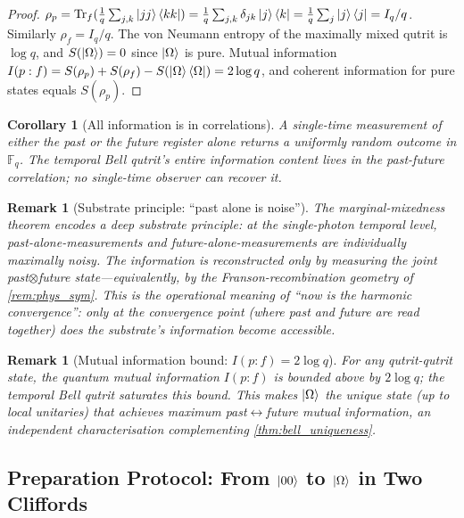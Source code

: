 ﻿\documentclass[12pt]{article}
\newtheorem{corollary}[theorem]{Corollary}
\newtheorem{remark}[theorem]{Remark}
\newcommand{\GF}[1]{\mathbb{F}_{#1}}
\begin{document}
\begin{proof}
$\rho_p = \mathrm{Tr}_f(\frac{1}{q}\sum_{j,k}\ket{jj}\bra{kk})
= \frac{1}{q}\sum_{j,k}\delta_{jk}\ket{j}\bra{k}
= \frac{1}{q}\sum_j\ket{j}\bra{j} = I_q/q$.  Similarly $\rho_f = I_q/q$.
The von Neumann entropy of the maximally mixed qutrit is $\log q$, and
$S(\ket{\Omega}) = 0$ since $\ket{\Omega}$ is pure.  Mutual information
$I(p:f) = S(\rho_p) + S(\rho_f) - S(\ket{\Omega}\bra{\Omega}) = 2 \log q$,
and coherent information for pure states equals $S(\rho_p)$.
\end{proof}

\begin{corollary}[All information is in correlations]\label{cor:correl}
A single-time measurement of either the past or the future register alone
returns a uniformly random outcome in $\GF{q}$.  The temporal Bell qutrit's
\emph{entire} information content lives in the past-future correlation; no
single-time observer can recover it.
\end{corollary}

\begin{remark}[Substrate principle: ``past alone is noise'']
The marginal-mixedness theorem encodes a deep substrate principle: at the
single-photon temporal level, past-alone-measurements and
future-alone-measurements are individually \emph{maximally noisy}.  The
information is reconstructed only by measuring the joint past$\otimes$future
state---equivalently, by the Franson-recombination geometry of
\cref{rem:phys_sym}.  This is the operational meaning of ``now is the
harmonic convergence'': only at the convergence point (where past and
future are read together) does the substrate's information become accessible.
\end{remark}

\begin{remark}[Mutual information bound: $I(p:f) = 2 \log q$]
For any qutrit-qutrit state, the quantum mutual information $I(p:f)$ is
bounded above by $2 \log q$; the temporal Bell qutrit saturates this bound.
This makes $\ket{\Omega}$ \emph{the unique state} (up to local unitaries)
that achieves maximum past$\leftrightarrow$future mutual information, an
independent characterisation complementing \cref{thm:bell_uniqueness}.
\end{remark}

\subsection{Preparation Protocol: From $\ket{00}$ to $\ket{\Omega}$ in Two Cliffords}
\label{sec:prep_protocol}
\end{document}
